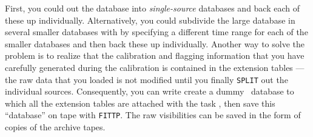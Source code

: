      First, you could {\tt {}} out the database into {\it
single-source} databases and back each of these up individually.
Alternatively, you could subdivide the large database in several
smaller databases with {\tt {}} by specifying a different
time range for each of the smaller databases and then back these up
individually.  Another way to solve the problem is to realize that the
calibration and flagging information that you have carefully generated
during the calibration is contained in the extension tables   --- the
raw data that you loaded is not modified until you finally {\tt SPLIT}
out the individual sources.  Consequently, you can write create a
dummy \uv\ database to which all the extension tables are attached
with the task {\tt {}}, then save this ``database'' on tape
with \hbox{{\tt FITTP}}.  The raw visibilities can be saved in the
form of copies of the archive tapes.



\bre
{}
\ere


\bre
{}
\ere

